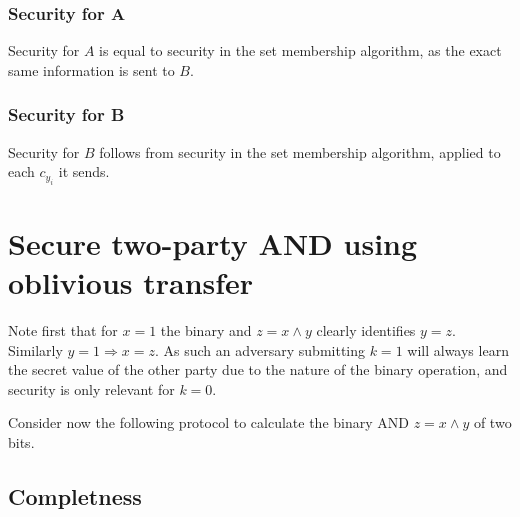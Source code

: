 \documentclass[a4paper]{scrreprt}
\begin{document}
\subsubsection{Security for A}

Security for $A$ is equal to security in the set membership algorithm, as the
exact same information is sent to $B$.

\subsubsection{Security for B}

Security for $B$ follows from security in the set membership algorithm, applied
to each $c_{y_i}$ it sends.

\section{Secure two-party AND using oblivious transfer}

Note first that for $x = 1$ the binary and $z = x \land y$ clearly identifies
$y = z$. Similarly $y = 1 \Rightarrow x = z$. As such an adversary submitting
$k = 1$ will always learn the secret value of the other party due to the nature
of the binary operation, and security is only relevant for $k = 0$.

Consider now the following protocol to calculate the binary AND $z = x \land y$
of two bits.


\subsection{Completness}
\end{document}

